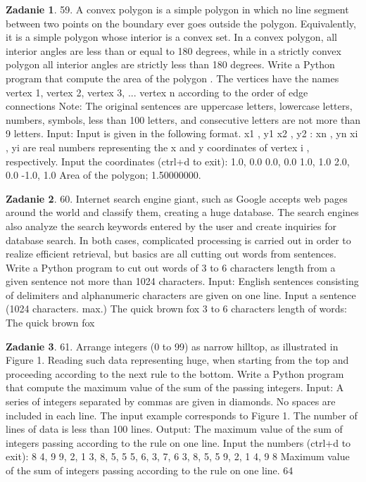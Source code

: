 \documentclass[11pt]{article}
\theoremstyle{definition}
\newtheorem{zadanie}{Zadanie}
\begin{document}
\begin{zadanie}


59. A convex polygon is a simple polygon in which no line segment between two points on the boundary ever goes outside the polygon. Equivalently, it is a simple polygon whose interior is a convex set. In a convex polygon, all interior angles are less than or equal to 180 degrees, while in a strictly convex polygon all interior angles are strictly less than 180 degrees.
Write a Python program that compute the area of the polygon . The vertices have the names vertex 1, vertex 2, vertex 3, ... vertex n according to the order of edge connections 
Note: The original sentences are uppercase letters, lowercase letters, numbers, symbols, less than 100 letters, and consecutive letters are not more than 9 letters.
Input:
Input is given in the following format.
x1 , y1
x2 , y2
:
xn , yn
xi , yi are real numbers representing the x and y coordinates of vertex i , respectively.
Input the coordinates (ctrl+d to exit):
1.0, 0.0
0.0, 0.0
1.0, 1.0
2.0, 0.0
-1.0, 1.0
Area of the polygon;
1.50000000.

\end{zadanie}

\begin{zadanie}


60. Internet search engine giant, such as Google accepts web pages around the world and classify them, creating a huge database. The search engines also analyze the search keywords entered by the user and create inquiries for database search. In both cases, complicated processing is carried out in order to realize efficient retrieval, but basics are all cutting out words from sentences.
Write a Python program to cut out words of 3 to 6 characters length from a given sentence not more than 1024 characters. 
Input:
English sentences consisting of delimiters and alphanumeric characters are given on one line.
Input a sentence (1024 characters. max.)
The quick brown fox
3 to 6 characters length of words:
The quick brown fox

\end{zadanie}

\begin{zadanie}


61. Arrange integers (0 to 99) as narrow hilltop, as illustrated in Figure 1. Reading such data representing huge, when starting from the top and proceeding according to the next rule to the bottom. Write a Python program that compute the maximum value of the sum of the passing integers. 
Input:
A series of integers separated by commas are given in diamonds. No spaces are included in each line. The input example corresponds to Figure 1. The number of lines of data is less than 100 lines.
Output:
The maximum value of the sum of integers passing according to the rule on one line.
Input the numbers (ctrl+d to exit):
8
4, 9
9, 2, 1
3, 8, 5, 5
5, 6, 3, 7, 6
3, 8, 5, 5
9, 2, 1
4, 9
8
Maximum value of the sum of integers passing according to the rule on one line.
64

\end{zadanie}
\end{document}
